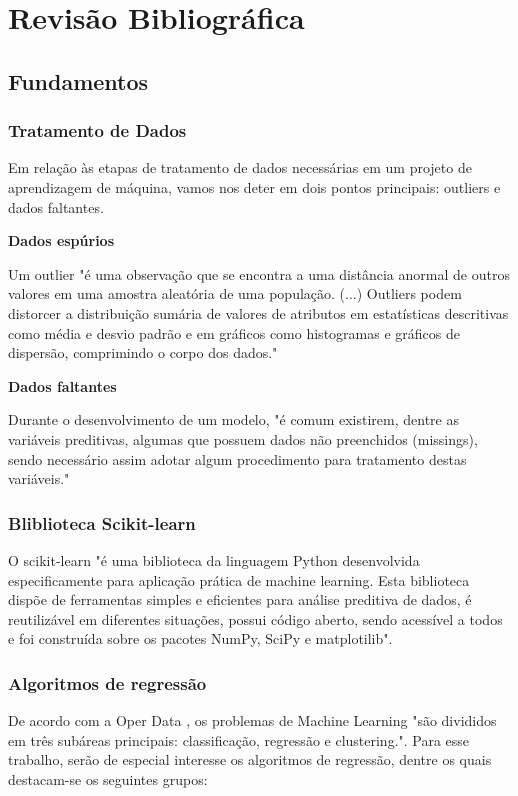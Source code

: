 

\chapter[Revisão Bibliográfica]{Revisão Bibliográfica}

    \section{Fundamentos}
    
        \subsection{Tratamento de Dados}
            Em relação às etapas de tratamento de dados necessárias em um projeto de aprendizagem de máquina, vamos nos deter em dois pontos principais: outliers e dados faltantes. 
        
            \textbf{Dados espúrios}\par
            Um outlier "é uma observação que se encontra a uma distância anormal de outros valores em uma amostra aleatória de uma população. (...) Outliers podem distorcer a distribuição sumária de valores de atributos em estatísticas descritivas como média e desvio padrão e em gráficos como histogramas e gráficos de dispersão, comprimindo o corpo dos dados." \cite{portal2018}
        
            \textbf{Dados faltantes}\par
            Durante o desenvolvimento de um modelo, "é comum existirem, dentre as variáveis preditivas, algumas que possuem dados não preenchidos (missings), sendo necessário assim adotar algum procedimento para tratamento destas variáveis." \cite{assuncao2012}

	    \subsection{Bliblioteca Scikit-learn}
	    O scikit-learn "é uma biblioteca da linguagem Python desenvolvida especificamente para aplicação prática de machine learning. Esta biblioteca dispõe de ferramentas simples e eficientes para análise preditiva de dados, é reutilizável em diferentes situações, possui código aberto, sendo acessível a todos e foi construída sobre os pacotes NumPy, SciPy e matplotilib". \cite{didatica2020}

        \subsection{Algoritmos de regressão}
	    De acordo com a Oper Data \cite{oper2020}, os problemas de Machine Learning "são divididos em três subáreas principais: classificação, regressão e clustering.". Para esse trabalho, serão de especial interesse os algoritmos de regressão, dentre os quais destacam-se os seguintes grupos:\par

